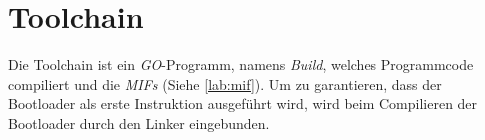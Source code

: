     \section{Toolchain}
        
        Die Toolchain ist ein \textit{GO}-Programm, namens \textit{Build},
        welches Programmcode compiliert und die \textit{MIFs} (Siehe \ref{lab:mif}).
        Um zu garantieren, dass der Bootloader als erste Instruktion ausgeführt wird,
        wird beim Compilieren der Bootloader durch den Linker eingebunden.
        